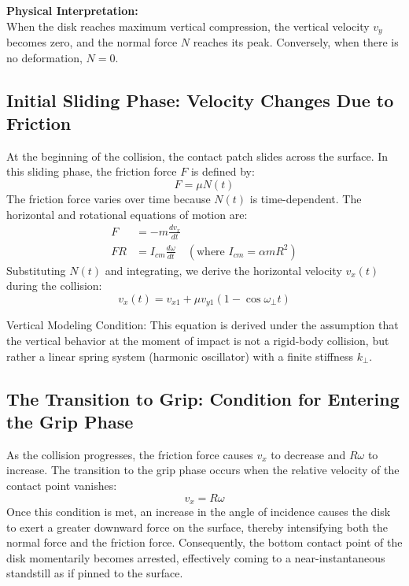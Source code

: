 \documentclass[11pt,letterpaper]{article}
\begin{document}
\begin{physicsinsight}
\textbf{Physical Interpretation:} \\When the disk reaches maximum vertical compression, the vertical velocity $v_y$ becomes zero, and the normal force $N$ reaches its peak. Conversely, when there is no deformation, $N=0$.
\end{physicsinsight}

\subsection{Initial Sliding Phase: Velocity Changes Due to Friction}
At the beginning of the collision, the contact patch slides across the surface. In this sliding phase, the friction force $F$ is defined by:
\begin{equation}
F = \mu N(t)
\end{equation}
The friction force varies over time because $N(t)$ is time-dependent. The horizontal and rotational equations of motion are:
\begin{align}
F &= -m \frac{dv_x}{dt} \\
FR &= I_{cm} \frac{d\omega}{dt} \quad (\text{where } I_{cm} = \alpha m R^2)
\end{align}
Substituting $N(t)$ and integrating, we derive the horizontal velocity $v_x(t)$ during the collision:
\begin{equation}
v_x(t) = v_{x1} + \mu v_{y1} (1 - \cos \omega_{\perp} t)
\end{equation}

Vertical Modeling Condition: This equation is derived under the assumption that the vertical behavior at the moment of impact is not a rigid-body collision, but rather a linear spring system (harmonic oscillator) with a finite stiffness $k_\perp$.

\subsection{The Transition to Grip: Condition for Entering the Grip Phase}
As the collision progresses, the friction force causes $v_x$ to decrease and $R\omega$ to increase. The transition to the grip phase occurs when the relative velocity of the contact point vanishes:
\begin{equation}
v_x = R\omega
\end{equation}
Once this condition is met, an increase in the angle of incidence causes the disk to exert a greater downward force on the surface, thereby intensifying both the normal force and the friction force. Consequently, the bottom contact point of the disk momentarily becomes arrested, effectively coming to a near-instantaneous standstill as if pinned to the surface.
\end{document}
